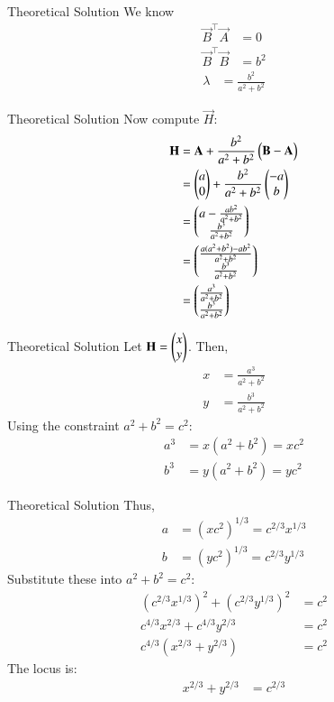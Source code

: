 \documentclass{beamer}
\begin{document}
\begin{frame}{Theoretical Solution}
We know
\begin{align}
\vec{B}^\top\vec{A}&=0\\
\vec{B}^\top\vec{B}&=b^2
\end{align}
\begin{align}
\lambda &= \frac{b^2}{a^2+b^2}
\end{align}
\end{frame}

\begin{frame}{Theoretical Solution}
Now compute $\vec{H}$:
\begin{align}
\mathbf{H} &= \mathbf{A} + \frac{b^2}{a^2+b^2}\begin{pmatrix}\mathbf{B}-\mathbf{A}\end{pmatrix}\\
&= \begin{pmatrix}a\\0\end{pmatrix} + \frac{b^2}{a^2+b^2}\begin{pmatrix}-a\\b\end{pmatrix} \\
&= \begin{pmatrix}a - \frac{ab^2}{a^2+b^2} \\ \frac{b^3}{a^2+b^2}\end{pmatrix} \\
&= \begin{pmatrix}\frac{a(a^2+b^2)-ab^2}{a^2+b^2} \\ \frac{b^3}{a^2+b^2}\end{pmatrix} \\
&= \begin{pmatrix}\frac{a^3}{a^2+b^2} \\ \frac{b^3}{a^2+b^2}\end{pmatrix}
\end{align}
\end{frame}

\begin{frame}{Theoretical Solution}
Let $\mathbf{H} = \begin{pmatrix}x\\y\end{pmatrix}$. Then,
\begin{align}
x &= \frac{a^3}{a^2+b^2} \\
y &= \frac{b^3}{a^2+b^2}
\end{align}
Using the constraint $a^2+b^2=c^2$:
\begin{align}
a^3 &= x(a^2+b^2) = xc^2 \\
b^3 &= y(a^2+b^2) = yc^2
\end{align}
\end{frame}

\begin{frame}{Theoretical Solution}
Thus,
\begin{align}
a &= (xc^2)^{1/3} = c^{2/3}x^{1/3} \\
b &= (yc^2)^{1/3} = c^{2/3}y^{1/3}
\end{align}
Substitute these into $a^2+b^2=c^2$:
\begin{align}
(c^{2/3}x^{1/3})^2 + (c^{2/3}y^{1/3})^2 &= c^2 \\
c^{4/3}x^{2/3} + c^{4/3}y^{2/3} &= c^2 \\
c^{4/3}(x^{2/3} + y^{2/3}) &= c^2
\end{align}
The locus is:
\begin{align}
x^{2/3} + y^{2/3} &= c^{2/3}
\end{align}
\end{frame}
\end{document}
